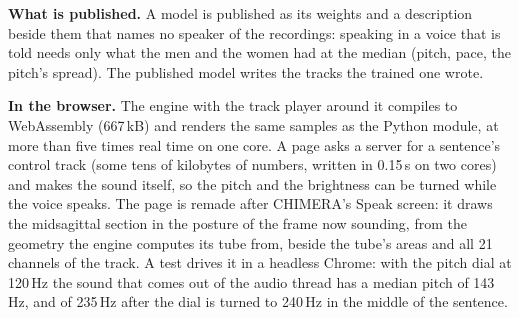 \documentclass[10pt,a4paper,twocolumn]{article}
\begin{document}
\textbf{What is published.} A model is published as its weights and a description beside them
that names no speaker of the recordings: speaking in a voice that is told needs only what the
men and the women had at the median (pitch, pace, the pitch's spread). The published model
writes the tracks the trained one wrote.

\textbf{In the browser.} The engine with the track player around it compiles to WebAssembly
(667\,kB) and renders the same samples as the Python module, at more than five times real time
on one core. A page asks a server for a sentence's control track (some tens of kilobytes of
numbers, written in 0.15\,s on two cores) and makes the sound itself, so the pitch and the
brightness can be turned while the voice speaks. The page is remade after CHIMERA's Speak
screen: it draws the midsagittal section in the posture of the frame now sounding, from the
geometry the engine computes its tube from, beside the tube's areas and all 21 channels of the
track. A test drives it in a headless Chrome: with the pitch dial at 120\,Hz the sound that
comes out of the audio thread has a median pitch of 143\,Hz, and of 235\,Hz after the dial is
turned to 240\,Hz in the middle of the sentence.
\end{document}
